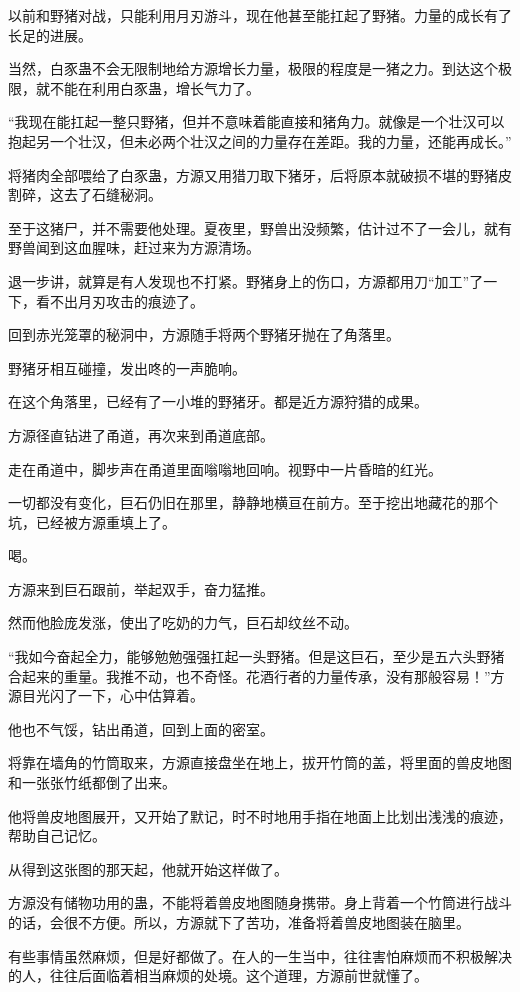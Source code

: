 \begin{this_body}
以前和野猪对战，只能利用月刃游斗，现在他甚至能扛起了野猪。力量的成长有了长足的进展。

当然，白豕蛊不会无限制地给方源增长力量，极限的程度是一猪之力。到达这个极限，就不能在利用白豕蛊，增长气力了。

“我现在能扛起一整只野猪，但并不意味着能直接和猪角力。就像是一个壮汉可以抱起另一个壮汉，但未必两个壮汉之间的力量存在差距。我的力量，还能再成长。”

将猪肉全部喂给了白豕蛊，方源又用猎刀取下猪牙，后将原本就破损不堪的野猪皮割碎，这去了石缝秘洞。

至于这猪尸，并不需要他处理。夏夜里，野兽出没频繁，估计过不了一会儿，就有野兽闻到这血腥味，赶过来为方源清场。

退一步讲，就算是有人发现也不打紧。野猪身上的伤口，方源都用刀“加工”了一下，看不出月刃攻击的痕迹了。

回到赤光笼罩的秘洞中，方源随手将两个野猪牙抛在了角落里。

野猪牙相互碰撞，发出咚的一声脆响。

在这个角落里，已经有了一小堆的野猪牙。都是近方源狩猎的成果。

方源径直钻进了甬道，再次来到甬道底部。

走在甬道中，脚步声在甬道里面嗡嗡地回响。视野中一片昏暗的红光。

一切都没有变化，巨石仍旧在那里，静静地横亘在前方。至于挖出地藏花的那个坑，已经被方源重填上了。

喝。

方源来到巨石跟前，举起双手，奋力猛推。

然而他脸庞发涨，使出了吃奶的力气，巨石却纹丝不动。

“我如今奋起全力，能够勉勉强强扛起一头野猪。但是这巨石，至少是五六头野猪合起来的重量。我推不动，也不奇怪。花酒行者的力量传承，没有那般容易！”方源目光闪了一下，心中估算着。

他也不气馁，钻出甬道，回到上面的密室。

将靠在墙角的竹筒取来，方源直接盘坐在地上，拔开竹筒的盖，将里面的兽皮地图和一张张竹纸都倒了出来。

他将兽皮地图展开，又开始了默记，时不时地用手指在地面上比划出浅浅的痕迹，帮助自己记忆。

从得到这张图的那天起，他就开始这样做了。

方源没有储物功用的蛊，不能将着兽皮地图随身携带。身上背着一个竹筒进行战斗的话，会很不方便。所以，方源就下了苦功，准备将着兽皮地图装在脑里。

有些事情虽然麻烦，但是好都做了。在人的一生当中，往往害怕麻烦而不积极解决的人，往往后面临着相当麻烦的处境。这个道理，方源前世就懂了。


\end{this_body}
